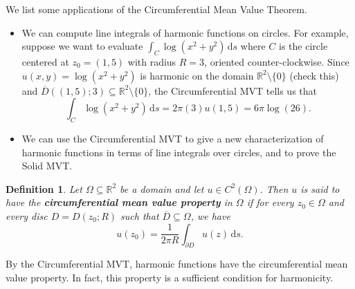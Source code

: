 \documentclass[10pt]{article}
\newcommand{\R}{\mathbb{R}}
\newcommand{\dd}{\,\mathrm{d}}
\theoremstyle{newstyle}
\newtheorem{defn}[thm]{Definition}
\begin{document}
We list some applications of the Circumferential Mean Value Theorem.
\begin{itemize}
    \item We can compute line integrals of harmonic functions on circles. For example, 
    suppose we want to evaluate $\int_C \log(x^2+y^2)\dd s$ where $C$ is the circle centered 
    at $z_0 = (1, 5)$ with radius $R = 3$, oriented counter-clockwise. Since $u(x, y) = 
    \log(x^2 + y^2)$ is harmonic on the domain $\R^2 \setminus \{0\}$ (check this) 
    and $\overline{D}((1, 5); 3) \subseteq \R^2 \setminus \{0\}$, the Circumferential MVT 
    tells us that 
    \[ \int_C \log(x^2 + y^2)\dd s = 2\pi(3) u(1, 5) = 6\pi \log(26). \]
    \item We can use the Circumferential MVT to give a new characterization of harmonic functions 
    in terms of line integrals over circles, and to prove the Solid MVT.
\end{itemize}

\begin{defn}
Let $\Omega \subseteq \R^2$ be a domain and let $u \in C^2(\Omega)$. Then $u$ is said to have the 
{\bf circumferential mean value property} in $\Omega$ if for every $z_0 \in \Omega$ and 
every disc $D = D(z_0; R)$ such that $\overline{D} \subseteq \Omega$, we have 
\[ u(z_0) = \frac{1}{2\pi R} \int_{\partial D} u(z)\dd s. \]
\end{defn}

By the Circumferential MVT, harmonic functions have the circumferential mean value property. 
In fact, this property is a sufficient condition for harmonicity.
\end{document}
